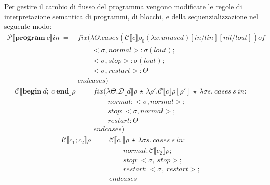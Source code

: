 \documentclass[a4paper,twosides]{report}
\begin{document}
Per gestire il cambio di flusso del programma vengono modificate le regole di interpretazione semantica di programmi, di blocchi, e
della sequenzializzazione nel seguente modo:
\begin{align*}
  \mathcal{P}\llbracket\mathbf{program}\ c\rrbracket in\ =\ &fix(\lambda\Theta.cases
  (\mathcal{C}\llbracket c\rrbracket\rho_0(\lambda
  x.unused)[in/lin][nil/lout]) of\\
  &\qquad<\sigma,normal> : \sigma(lout);\\
  &\qquad<\sigma,stop> : \sigma(lout);\\
  &\qquad<\sigma,restart> : \Theta\\
  &endcases)
\end{align*}
\begin{align*}
  \mathcal{C}\llbracket\mathbf{begin}\ d;\ c\
  \mathbf{end}\rrbracket\rho\ =\ &fix(\lambda\Theta.\mathcal{D}\llbracket d\rrbracket\rho\
  \star\ \lambda\rho'.\mathcal{C}\llbracket c\rrbracket\rho[\rho']\
  \star\ \lambda\sigma s.\ cases\ s\ in:\\
  & \qquad normal:<\sigma,normal>;\\
  & \qquad stop:<\sigma,normal>;\\
  & \qquad restart:\Theta\\
  &endcases)
\end{align*}
\begin{align*}
  \mathcal{C}\llbracket c_1;c_2\rrbracket\rho\ =\ &\mathcal{C}\llbracket
  c_1\rrbracket\rho\ \star\ \lambda\sigma s.\ cases\ s\ in:\\
  & \qquad normal:\mathcal{C}\llbracket c_2\rrbracket\rho;\\
  & \qquad stop:<\sigma,\ stop>;\\
  & \qquad restart:<\sigma,\ restart>;\\
  & endcases
\end{align*}
\end{document}
